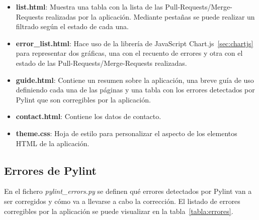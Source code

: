 \documentclass[a4paper, 12pt]{book}
\begin{document}
\begin{itemize}
	\item \textbf{list.html}: Muestra una tabla con la lista de las Pull-Requests/Merge-Requests realizadas por la aplicación. Mediante pestañas se puede realizar un filtrado según el estado de cada una.
	\item \textbf{error\_list.html}: Hace uso de la librería de JavaScript Chart.js~\ref{sec:chartjs} para representar dos gráficas, una con el recuento de errores y otra con el estado de las Pull-Requests/Merge-Requests realizadas.
	\item \textbf{guide.html}: Contiene un resumen sobre la aplicación, una breve guía de uso definiendo cada una de las páginas y una tabla con los errores detectados por Pylint que son corregibles por la aplicación.
	\item \textbf{contact.html}: Contiene los datos de contacto.
	\item \textbf{theme.css}: Hoja de estilo para personalizar el aspecto de los elementos HTML de la aplicación.
\end{itemize}

\subsection{Errores de Pylint}
\label{subsec:errores}

En el fichero \textit{pylint\_errors.py} se definen qué errores detectados por Pylint van a ser corregidos y cómo va a llevarse a cabo la corrección. 
El listado de errores corregibles por la aplicación se puede visualizar en la tabla~\ref{tabla:errores}.
\end{document}
